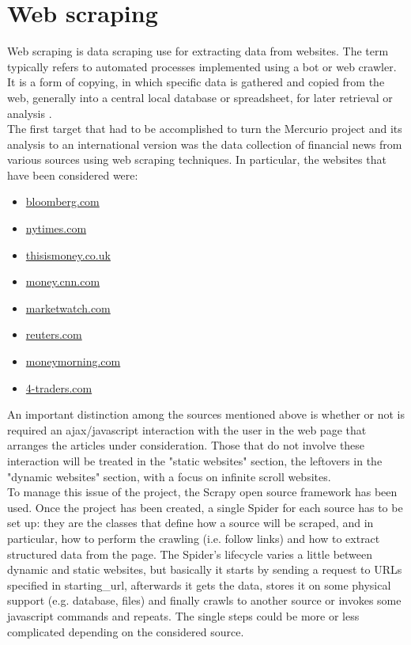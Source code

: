 \section{Web scraping}
Web scraping is data scraping use for extracting data from websites. The term typically refers to automated processes implemented using a bot or web crawler. It is a form of copying, in which specific data is gathered and copied from the web, generally into a central local database or spreadsheet, for later retrieval or analysis \cite{webscrapingwiki}. \\
The first target that had to be accomplished to turn the Mercurio project and its analysis to an international version was the data collection of financial news from various sources using web scraping techniques. In particular, the websites that have been considered were: 
\begin{itemize}
\item \href{https://www.bloomberg.com}{bloomberg.com}
\item \href{https://www.nytimes.com}{nytimes.com}
\item \href{https://www.thisismoney.co.uk}{thisismoney.co.uk}
\item \href{http://money.cnn.com}{money.cnn.com}
\item \href{http://www.marketwatch.com}{marketwatch.com}
\item \href{http://www.reuters.com}{reuters.com}
\item \href{http://www.moneymorning.com}{moneymorning.com} 
\item \href{http://www.4-traders.com/}{4-traders.com}
\end{itemize}
An important distinction among the sources mentioned above is whether or not is required an ajax/javascript interaction with the user in the web page that arranges the articles under consideration. Those that do not involve these interaction will be treated in the "static websites" section, the leftovers in the "dynamic websites" section, with a focus on infinite scroll websites. \\ 
To manage this issue of the project, the Scrapy open source framework \cite{scrapyframework} has been used. %
Once the project has been created, a single Spider \cite{scrapyspider} for each source has to be set up: they are the classes that define how a source will be scraped, and in particular, how to perform the crawling (i.e. follow links) and how to extract structured data from the page. The Spider's lifecycle varies a little between dynamic and static websites, but basically it starts by sending a request to URLs specified in starting\_url, afterwards it gets the data, stores it on some physical support (e.g. database, files) and finally crawls to another source or invokes some javascript commands and repeats. The single steps could be more or less complicated depending on the considered source. \\
